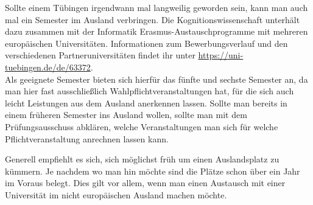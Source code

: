 Sollte einem Tübingen irgendwann mal langweilig geworden sein, kann man auch mal ein Semester im Ausland verbringen. Die Kognitionswissenschaft unterhält dazu zusammen mit der Informatik Erasmus-Austauschprogramme mit mehreren europäischen Universitäten. Informationen zum Bewerbungsverlauf und den verschiedenen Partneruniversitäten findet ihr unter \url{https://uni-tuebingen.de/de/63372}.\\	%

Als geeignete Semester bieten sich hierfür das fünfte und sechste Semester an, da man hier fast ausschließlich Wahlpflichtveranstaltungen hat, für die sich auch leicht Leistungen aus dem Ausland anerkennen lassen. Sollte man bereits in einem früheren Semester ins Ausland wollen, sollte man mit dem Prüfungsausschuss abklären, welche Veranstaltungen man sich für welche Pflichtveranstaltung anrechnen lassen kann.

Generell empfiehlt es sich, sich möglichst früh um einen Auslandsplatz zu kümmern. Je nachdem wo man hin möchte sind die Plätze schon über ein Jahr im Voraus belegt. Dies gilt vor allem, wenn man einen Austausch mit einer Universität im nicht europäischen Ausland machen möchte.